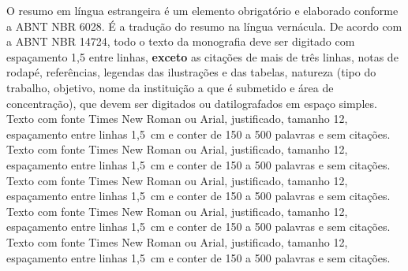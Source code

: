 O resumo em língua estrangeira é um elemento obrigatório e elaborado conforme
a ABNT NBR 6028. É a tradução do resumo na língua vernácula. De acordo com a
ABNT NBR 14724, todo o texto da monografia deve ser digitado com espaçamento
1,5 entre linhas, \textbf{exceto} as citações de mais de três linhas, notas de rodapé,
referências, legendas das ilustrações e das tabelas, natureza (tipo do
trabalho, objetivo, nome da instituição a que é submetido e área de
concentração), que devem ser digitados ou datilografados em espaço simples.
Texto com fonte Times New Roman ou Arial, justificado, tamanho 12, espaçamento
entre linhas 1,5~cm e conter de 150 a 500 palavras e sem citações. Texto com
fonte Times New Roman ou Arial, justificado, tamanho 12, espaçamento entre
linhas 1,5~cm e conter de 150 a 500 palavras e sem citações. Texto com fonte
Times New Roman ou Arial, justificado, tamanho 12, espaçamento entre linhas
1,5~cm e conter de 150 a 500 palavras e sem citações. Texto com fonte Times
New Roman ou Arial, justificado, tamanho 12, espaçamento entre linhas 1,5~cm e
conter de 150 a 500 palavras e sem citações. Texto com fonte Times New Roman
ou Arial, justificado, tamanho 12, espaçamento entre linhas 1,5~cm e conter de
150 a 500 palavras e sem citações.


